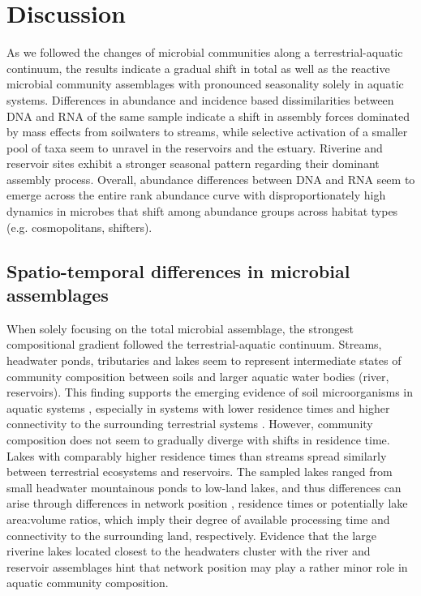 \documentclass[12pt,a4paper]{article} %
\begin{document}
\section*{Discussion}
As we followed the changes of microbial communities along a terrestrial-aquatic continuum, the results indicate a gradual shift in total as well as the reactive microbial community assemblages with pronounced seasonality solely in aquatic systems. Differences in abundance and incidence based dissimilarities between DNA and RNA of the same sample indicate a shift in assembly forces dominated by mass effects from soilwaters to streams, while selective activation of a smaller pool of taxa seem to unravel in the reservoirs and the estuary. Riverine and reservoir sites exhibit a stronger seasonal pattern regarding their dominant assembly process. Overall, abundance differences between DNA and RNA seem to emerge across the entire rank abundance curve with disproportionately high dynamics in microbes that shift among abundance groups across habitat types (e.g. cosmopolitans, shifters).

\subsection*{Spatio-temporal differences in microbial assemblages}
When solely focusing on the total microbial assemblage, the strongest compositional gradient followed the terrestrial-aquatic continuum. Streams, headwater ponds, tributaries and lakes seem to represent intermediate states of community composition between soils and larger aquatic water bodies (river, reservoirs). This finding supports the emerging evidence of soil microorganisms in aquatic systems \citep{Ruiz-Gonzalez2015, Hauptmann2016}, especially in systems with lower residence times and higher connectivity to the surrounding terrestrial systems \citep{Crump2012, Besemer2013}. However, community composition does not seem to gradually diverge with shifts in residence time. Lakes with comparably higher residence times than streams spread similarly between terrestrial ecosystems and reservoirs. The sampled lakes ranged from small headwater mountainous ponds to low-land lakes, and thus differences can arise through differences in network position \citep{Carrara2013}, residence times \citep{Logue2010} or potentially lake area:volume ratios, which imply their degree of available processing time and connectivity to the surrounding land, respectively. Evidence that the large riverine lakes located closest to the headwaters cluster with the river and reservoir assemblages hint that network position may play a rather minor role in aquatic community composition.
\end{document}
